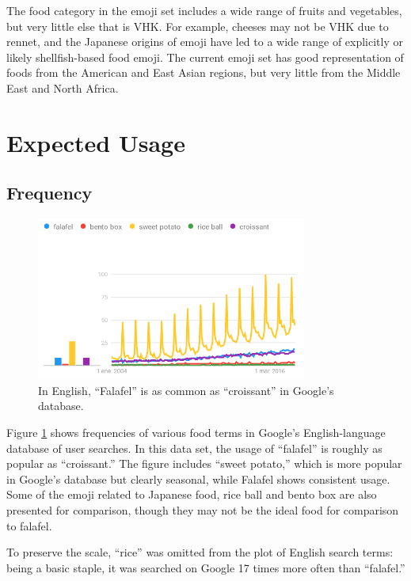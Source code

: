 \documentclass[a4paper,10pt]{article}
\begin{document}
The food category in the emoji set includes a wide range of fruits and vegetables, but
very little else that is VHK. For example, cheeses may not be VHK due to rennet, and the
Japanese origins of emoji have led to a wide range of explicitly or likely
shellfish-based food emoji. The current emoji set has good representation of foods
from the American and East Asian regions, but very little from the Middle East and
North Africa.

\section{Expected Usage}

\subsection{Frequency}\label{freqsec}

\begin{figure}
\begin{center}
\includegraphics[width=3.5in]{trends.png}
\end{center}
\caption{In English, ``Falafel'' is as common as ``croissant'' in Google's database.}
\label{engplot}
\end{figure}


Figure \ref{engplot} shows frequencies of various food terms in Google's English-language
database of user searches.  In this data set, the usage of ``falafel'' is roughly as popular as
``croissant.'' 
The figure includes ``sweet potato,'' which is more popular
in Google's database but clearly seasonal, while Falafel shows consistent usage.
Some of the emoji related to Japanese food, {\sc rice ball} and {\sc bento box} are also
presented for comparison, though they may not be the ideal food for comparison to falafel.

To preserve the scale, ``rice'' was omitted from the plot of English search terms:
being a basic staple, it was searched on Google 17 times more often than ``falafel.''
\end{document}

